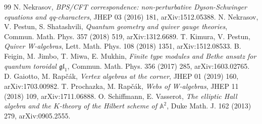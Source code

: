\begin{thebibliography}{99}
 N. Nekrasov, \emph{BPS/CFT correspondence:
non-perturbative Dyson-Schwinger equations and qq-characters}, JHEP 03
(2016) 181, arXiv:1512.05388.
 N. Nekrasov, V. Pestun, S. Shatashvili,
\emph{Quantum geometry and quiver gauge theories}, Commun. Math. Phys.
357 (2018) 519, arXiv:1312.6689.
 T. Kimura, V. Pestun, \emph{Quiver W-algebras},
Lett. Math. Phys. 108 (2018) 1351, arXiv:1512.08533.
 B. Feigin, M. Jimbo, T. Miwa, E. Mukhin, \emph{Finite
type modules and Bethe ansatz for quantum toroidal $\mathfrak{gl}_1$},
Commun. Math. Phys. 356 (2017) 285, arXiv:1603.02765.
 D. Gaiotto, M. Rap\v{c}\'ak, \emph{Vertex
algebras at the corner}, JHEP 01 (2019) 160, arXiv:1703.00982.
 T. Prochazka, M. Rap\v{c}\'ak, \emph{Webs
of W-algebras}, JHEP 11 (2018) 109, arXiv:1711.06888.
 O. Schiffmann, E. Vasserot, \emph{The
elliptic Hall algebra and the $K$-theory of the Hilbert scheme of
$\mathbb{A}^2$}, Duke Math. J. 162 (2013) 279, arXiv:0905.2555.
\end{thebibliography}
